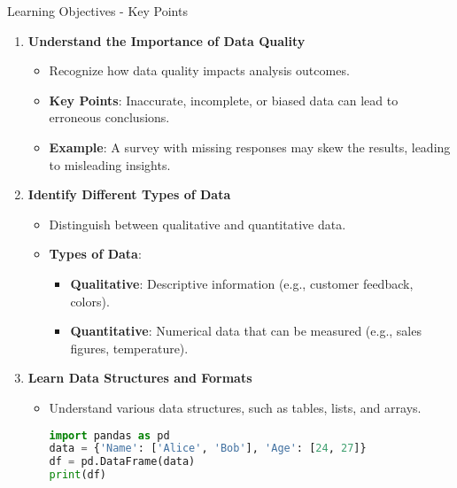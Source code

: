 \documentclass[aspectratio=169]{beamer}
\begin{document}
\begin{frame}[fragile]{Learning Objectives - Key Points}
    \begin{enumerate}
        \item \textbf{Understand the Importance of Data Quality}  
            \begin{itemize}
                \item Recognize how data quality impacts analysis outcomes.  
                \item \textbf{Key Points}: Inaccurate, incomplete, or biased data can lead to erroneous conclusions.
                \item \textbf{Example}: A survey with missing responses may skew the results, leading to misleading insights.
            \end{itemize}

        \item \textbf{Identify Different Types of Data}
            \begin{itemize}
                \item Distinguish between qualitative and quantitative data.  
                \item \textbf{Types of Data}:
                \begin{itemize}
                    \item \textbf{Qualitative}: Descriptive information (e.g., customer feedback, colors).
                    \item \textbf{Quantitative}: Numerical data that can be measured (e.g., sales figures, temperature).
                \end{itemize}
            \end{itemize}

        \item \textbf{Learn Data Structures and Formats}
            \begin{itemize}
                \item Understand various data structures, such as tables, lists, and arrays.  
                \begin{lstlisting}[language=Python]
import pandas as pd
data = {'Name': ['Alice', 'Bob'], 'Age': [24, 27]}
df = pd.DataFrame(data)
print(df)
                \end{lstlisting}
            \end{itemize}
    \end{enumerate}
\end{frame}
\end{document}
